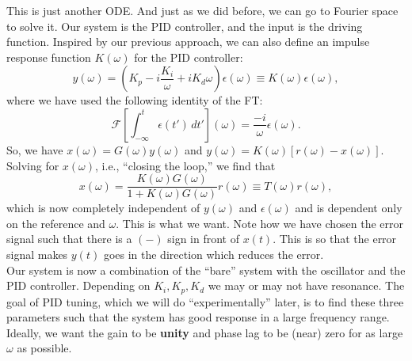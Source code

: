 \documentclass{article}
\theoremstyle{definition}
\newcommand{\F}{\mathcal{F}}
\newcommand{\f}[2]{\frac{#1}{#2}}
\newcommand{\lp}{\left(}
\newcommand{\rp}{\right)}
\newcommand{\lb}{\left[}
\newcommand{\rb}{\right]}
\begin{document}
This is just another ODE. And just as we did before, we can go to Fourier space to solve it. Our system is the PID controller, and the input is the driving function. Inspired by our previous approach, we can also define an impulse response function $K(\omega)$ for the PID controller:
\begin{equation*}
y(\omega) = \lp K_p - i\f{K_i}{\omega} + iK_d\omega \rp \epsilon(\omega) \equiv K(\omega) \epsilon(\omega),
\end{equation*}
where we have used the following identity of the FT:
\begin{equation*}
\F\lb \int_{-\infty}^t \epsilon(t')\,dt' \rb(\omega) = \f{-i}{\omega}\epsilon(\omega).
\end{equation*}
So, we have $x(\omega) = G(\omega)y(\omega)$ and $y(\omega) = K(\omega)[r(\omega) - x(\omega)]$. Solving for $x(\omega)$, i.e., ``closing the loop,'' we find that 
\begin{equation*}
x(\omega)  = \f{K(\omega) G(\omega)}{1+ K(\omega) G(\omega)} r(\omega) \equiv T(\omega) r(\omega),
\end{equation*} 
which is now completely independent of $y(\omega)$ and $\epsilon(\omega)$ and is dependent only on the reference and $\omega$. This is what we want. Note how we have chosen the error signal such that there is a $(-)$ sign in front of $x(t)$. This is so that the error signal makes $y(t)$ goes in the direction which reduces the error. \\

\noindent Our system is now a combination of the ``bare'' system with the oscillator and the PID controller. Depending on $K_i, K_p, K_d$ we may or may not have resonance. The goal of PID tuning, which we will do ``experimentally'' later, is to find these three parameters such that the system has good response in a large frequency range. Ideally, we want the gain to be \textbf{unity} and phase lag to be (near) zero for as large $\omega$ as possible.\\
\end{document}
